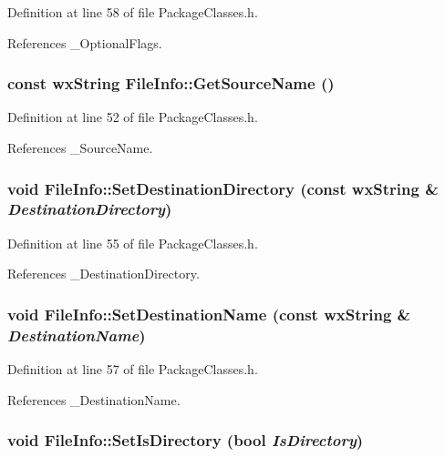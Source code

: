 Definition at line 58 of file Package\-Classes.h.

References \_\-Optional\-Flags.
\subsubsection{\setlength{\rightskip}{0pt plus 5cm}const wx\-String File\-Info::Get\-Source\-Name ()\hspace{0.3cm}{\tt  [inline]}}\label{class_file_info_df135a1625d10bdf99853083e5b0e891}




Definition at line 52 of file Package\-Classes.h.

References \_\-Source\-Name.
\subsubsection{\setlength{\rightskip}{0pt plus 5cm}void File\-Info::Set\-Destination\-Directory (const wx\-String \& {\em Destination\-Directory})\hspace{0.3cm}{\tt  [inline]}}\label{class_file_info_4fc948cec75c002585d35aadca6fc7c5}




Definition at line 55 of file Package\-Classes.h.

References \_\-Destination\-Directory.
\subsubsection{\setlength{\rightskip}{0pt plus 5cm}void File\-Info::Set\-Destination\-Name (const wx\-String \& {\em Destination\-Name})\hspace{0.3cm}{\tt  [inline]}}\label{class_file_info_22ca91c1b66c0f7926d73da77c10c6ac}




Definition at line 57 of file Package\-Classes.h.

References \_\-Destination\-Name.
\subsubsection{\setlength{\rightskip}{0pt plus 5cm}void File\-Info::Set\-Is\-Directory (bool {\em Is\-Directory})\hspace{0.3cm}{\tt  [inline]}}\label{class_file_info_aea47d0efe9169cb221a5ff4386e405e}




